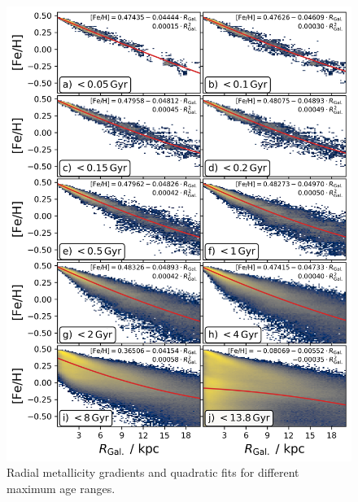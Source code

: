 \documentclass[fleqn,usenatbib]{mnras}
\begin{document}
\begin{figure}
    \centering
    \includegraphics[width=\columnwidth]{figures/quadratic_fit_across_maximum_ages.png}
    \caption{Radial metallicity gradients and quadratic fits for different maximum age ranges.}
    \label{fig:quadratic_fit_across_maximum_ages}
\end{figure}
\end{document}
